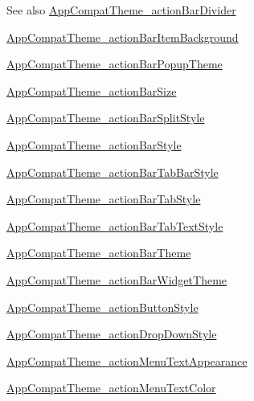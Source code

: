 \begin{DoxySeeAlso}{See also}
\hyperlink{classproject4_1_1xaria_1_1R_1_1styleable_ad095f54263895a9187adcc505fb74a8f}{App\+Compat\+Theme\+\_\+action\+Bar\+Divider} 

\hyperlink{classproject4_1_1xaria_1_1R_1_1styleable_a41713bbf73db9bc84e075b5f7f3d9eac}{App\+Compat\+Theme\+\_\+action\+Bar\+Item\+Background} 

\hyperlink{classproject4_1_1xaria_1_1R_1_1styleable_a4ab9cdea85449aae1d84d21ff4fb2cfa}{App\+Compat\+Theme\+\_\+action\+Bar\+Popup\+Theme} 

\hyperlink{classproject4_1_1xaria_1_1R_1_1styleable_ab4089eb2d0e03e7fe09ecada776ec627}{App\+Compat\+Theme\+\_\+action\+Bar\+Size} 

\hyperlink{classproject4_1_1xaria_1_1R_1_1styleable_ac50c18be5c3e3ba9e240f8f463553bb8}{App\+Compat\+Theme\+\_\+action\+Bar\+Split\+Style} 

\hyperlink{classproject4_1_1xaria_1_1R_1_1styleable_abe5ffee6e83546a5c7599f052a12bdba}{App\+Compat\+Theme\+\_\+action\+Bar\+Style} 

\hyperlink{classproject4_1_1xaria_1_1R_1_1styleable_a8061a97d3435cd3b90071e77b6a384d0}{App\+Compat\+Theme\+\_\+action\+Bar\+Tab\+Bar\+Style} 

\hyperlink{classproject4_1_1xaria_1_1R_1_1styleable_ac191cc6e34d8b07e8c5375d0e9060ad5}{App\+Compat\+Theme\+\_\+action\+Bar\+Tab\+Style} 

\hyperlink{classproject4_1_1xaria_1_1R_1_1styleable_ac76a4f213c72e9795418b8e7289f0feb}{App\+Compat\+Theme\+\_\+action\+Bar\+Tab\+Text\+Style} 

\hyperlink{classproject4_1_1xaria_1_1R_1_1styleable_a872840b3faa033949bb39c7e8ccf3802}{App\+Compat\+Theme\+\_\+action\+Bar\+Theme} 

\hyperlink{classproject4_1_1xaria_1_1R_1_1styleable_acd160671a7a2ffa11d0fcabb3488ff5f}{App\+Compat\+Theme\+\_\+action\+Bar\+Widget\+Theme} 

\hyperlink{classproject4_1_1xaria_1_1R_1_1styleable_ac0a46ce92a97f618843444fe78e175e5}{App\+Compat\+Theme\+\_\+action\+Button\+Style} 

\hyperlink{classproject4_1_1xaria_1_1R_1_1styleable_a3ed86c6082101f35233a25e96d5bd2f3}{App\+Compat\+Theme\+\_\+action\+Drop\+Down\+Style} 

\hyperlink{classproject4_1_1xaria_1_1R_1_1styleable_aaf321468ea719fc98d678e0a033cf5b4}{App\+Compat\+Theme\+\_\+action\+Menu\+Text\+Appearance} 

\hyperlink{classproject4_1_1xaria_1_1R_1_1styleable_a3a86c177d90451263e2f960e5e8dd93f}{App\+Compat\+Theme\+\_\+action\+Menu\+Text\+Color} 


\end{DoxySeeAlso}
